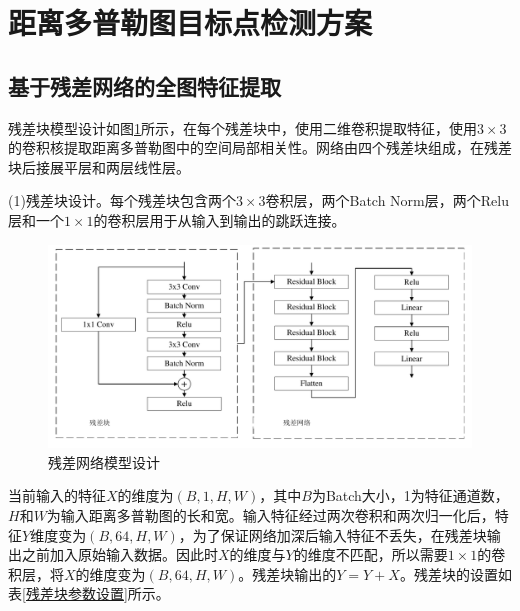 \section{距离多普勒图目标点检测方案}

\subsection{基于残差网络的全图特征提取}
残差块模型设计如图\ref{fig:ResidualNet}所示，在每个残差块中，使用二维卷积提取特征，使用$3\times3$的卷积核提取距离多普勒图中的空间局部相关性。网络由四个残差块组成，在残差块后接展平层和两层线性层。

(1)残差块设计。每个残差块包含两个$3\times3$卷积层，两个Batch Norm层，两个Relu层和一个$1\times1$的卷积层用于从输入到输出的跳跃连接。
\begin{figure}[htbp]
	\centering
	\includegraphics[width=\linewidth]{figures/残差网络.pdf}
	\caption{残差网络模型设计}
	\label{fig:ResidualNet}
\end{figure}
当前输入的特征$X$的维度为$(B,1,H,W)$，其中$B$为Batch大小，1为特征通道数，$H$和$W$为输入距离多普勒图的长和宽。输入特征经过两次卷积和两次归一化后，特征$Y$维度变为$(B,64,H,W)$，为了保证网络加深后输入特征不丢失，在残差块输出之前加入原始输入数据。因此时$X$的维度与$Y$的维度不匹配，所以需要$1\times1$的卷积层，将$X$的维度变为$(B,64,H,W)$。残差块输出的$Y=Y+X$。残差块的设置如表\ref{残差块参数设置}所示。

